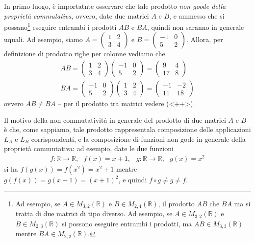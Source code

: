 In primo luogo, è importatnte osservare che tale prodotto \textit{non goode della proprietà
  commutativa}, ovvero, date due matrici $A$ e $B$, e ammesso che si possano\footnote{Ad esempio,
  se $A\in M_{3,2}(\mathbb{R})$ e $B\in M_{2,4}(\mathbb{R})$, il prodotto $AB$ che $BA$ ma si
  tratta di due matrici di tipo diverso. Ad esempio, se $A\in M_{3,2}(\mathbb{R})$ e
  $B\in M_{2,3}(\mathbb{R})$ si possono eseguire entrambi i prodotti, ma $AB\in M_{3,3}
  (\mathbb{R})$ mentre $BA\in M_{2,2}(\mathbb{R})$.} eseguire entrambi i prodotti $AB$ e $BA$,
quindi non saranno in generale uquali. Ad esempio, siamo $A=
\begin{pmatrix}
  1 &2\\
  3 &4
\end{pmatrix}
$ e $B=
\begin{pmatrix}
  -1 & 0\\
  5 & 2
\end{pmatrix}
$. Allora, per definizione di prodotto righe per colonne vediamo che
\begin{eqnarray*}
  AB=
  \begin{pmatrix}
    1 &2\\
    3 &4
  \end{pmatrix}
  \begin{pmatrix}
    -1 &0\\
    5 & 2
  \end{pmatrix}=
  \begin{pmatrix}
    9& 4 \\
    17 & 8
  \end{pmatrix}\\
  BA=\begin{pmatrix}
    -1 &0\\
    5 & 2
  \end{pmatrix}
  \begin{pmatrix}
    1 &2\\
    3 &4
  \end{pmatrix}=
  \begin{pmatrix}
    -1 & -2\\
    11 & 18
  \end{pmatrix}
\end{eqnarray*}
ovvero $AB\neq BA$ --
per il prodotto tra matrici vedere (<++>).
\begin{osservazione}
  Il motivo della non commutatività in generale del prodotto di due matrici $A$ e $B$ è che,
  come sappiamo, tale prodotto rappresentala composizione delle applicazioni $L_A$ e $L_B$
  corrispondenti, e la composizione di funzioni non gode in generale della proprietà commutativa:
  ad esempio, date le due funzioni
  \begin{eqnarray*}
    f:\mathbb{R}\to \mathbb{R},\text{ } f(x)=x+1, & g:\mathbb{R}\to \mathbb{R},\text{ }g(x)=x^2
  \end{eqnarray*}
  si ha $f(g(x))=f(x^2)=x^2+1$ mentre $g(f(x))=g(x+1)=(x+1)^2$, e quindi $f\circ g\neq g\neq f$.
\end{osservazione}
